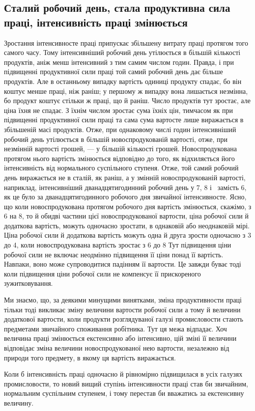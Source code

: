 
\subsection{Сталий робочий день, стала продуктивна сила праці,
інтенсивність праці змінюється}

Зростання інтенсивносте праці припускає збільшену витрату
праці протягом того самого часу. Тому інтенсивніший робочий
день утілюється в більшій кількості продуктів, аніж менш
інтенсивний з тим самим числом годин. Правда, і при підвищенні
продуктивної сили праці той самий робочий день дає
більше продуктів. Але в останньому випадку вартість одиниці
продукту спадає, бо він коштує менше праці, ніж раніш; у першому
ж випадку вона лишається незмінна, бо продукт коштує
стільки ж праці, що й раніш. Число продуктів тут зростає, але
ціна їхня не спадає. З їхнім числом зростає сума їхніх цін, тимчасом
як при підвищенні продуктивної сили праці та сама сума
вартосте лише виражається в збільшеній масі продуктів. Отже,
при однаковому числі годин інтенсивніший робочий день утілюється
в більшій новоспродукованій вартості, отже, при незмінній
вартості грошей, — у більшій кількості грошей. Новоспродукована
протягом нього вартість змінюється відповідно до того,
як відхиляється його інтенсивність від нормального суспільного
ступеня. Отже, той самий робочий день виражається не в сталій,
як раніш, а у змінній новоспродукованій вартості, наприклад,
інтенсивніший дванадцятигодинний робочий день у 7,
8 і~ замість 6, як це було за дванадцятигодинного
робочого дня звичайної інтенсивносте. Ясно, що коли
новоспродукована протягом робочого дня вартість змінюється,
скажімо, з 6 на 8, то й обидві частини цієї
новоспродукованої вартости, ціна робочої сили й додаткова вартість,
можуть одночасно зростати, в однаковій або неоднаковій
мірі. Ціна робочої сили й додаткова вартість можуть одна й друга
зрости одночасно з 3 до 4, коли новоспродукована вартість
зростає з 6 до 8 Тут підвищення ціни робочої
сили не включає неодмінно підвищення її ціни понад її вартість.
Навпаки, воно може супроводитися падінням її вартости. Це
завжди буває тоді коли підвищення ціни робочої сили не компенсує
її прискореного зужитковування.

Ми знаємо, що, за деякими минущими винятками, зміна
продуктивности праці тільки тоді викликає зміну величини вартости
робочої сили а тому й величини додаткової вартости, коли
продукти розглядуваної галузі промисловости стають предметами
звичайного споживання робітника. Тут ця межа відпадає.
Хоч величина праці змінюється екстенсивно або інтенсивно, цій
зміні її величини відповідає зміна величини новоспродукованої
нею вартости, незалежно від природи того предмету, в якому
ця вартість виражається.

Коли б інтенсивність праці одночасно й рівномірно підвищилася
в усіх галузях промисловости, то новий вищий ступінь інтенсивности
праці став би звичайним, нормальним суспільним ступенем,
і тому перестав би вважатись за екстенсивну величину.
\parbreak{}  %
